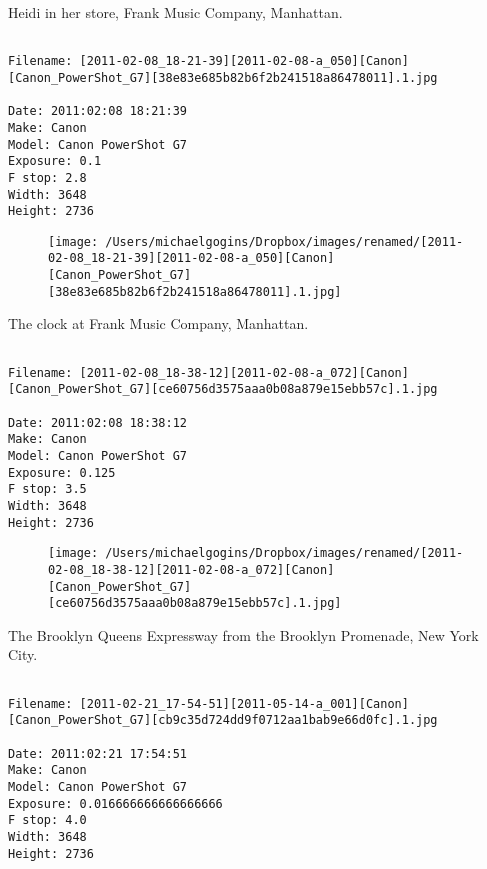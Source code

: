 \documentclass[11pt,letter,DIV=14,paper=landscape]{scrbook}
\begin{document}
\clearpage
\noindent Heidi in her store, Frank Music Company, Manhattan.
\noindent
\begin{lstlisting}

Filename: [2011-02-08_18-21-39][2011-02-08-a_050][Canon][Canon_PowerShot_G7][38e83e685b82b6f2b241518a86478011].1.jpg

Date: 2011:02:08 18:21:39
Make: Canon
Model: Canon PowerShot G7
Exposure: 0.1
F stop: 2.8
Width: 3648
Height: 2736
\end{lstlisting}
\clearpage

\begin{figure}
\texttt{[image: /Users/michaelgogins/Dropbox/images/renamed/[2011-02-08\_18-21-39][2011-02-08-a\_050][Canon][Canon\_PowerShot\_G7][38e83e685b82b6f2b241518a86478011].1.jpg]}
\end{figure}
    
\clearpage
\noindent The clock at Frank Music Company, Manhattan.
\noindent
\begin{lstlisting}

Filename: [2011-02-08_18-38-12][2011-02-08-a_072][Canon][Canon_PowerShot_G7][ce60756d3575aaa0b08a879e15ebb57c].1.jpg

Date: 2011:02:08 18:38:12
Make: Canon
Model: Canon PowerShot G7
Exposure: 0.125
F stop: 3.5
Width: 3648
Height: 2736
\end{lstlisting}
\clearpage

\begin{figure}
\texttt{[image: /Users/michaelgogins/Dropbox/images/renamed/[2011-02-08\_18-38-12][2011-02-08-a\_072][Canon][Canon\_PowerShot\_G7][ce60756d3575aaa0b08a879e15ebb57c].1.jpg]}
\end{figure}
    
\clearpage
\noindent The Brooklyn Queens Expressway from the Brooklyn Promenade, New York City.
\noindent
\begin{lstlisting}

Filename: [2011-02-21_17-54-51][2011-05-14-a_001][Canon][Canon_PowerShot_G7][cb9c35d724dd9f0712aa1bab9e66d0fc].1.jpg

Date: 2011:02:21 17:54:51
Make: Canon
Model: Canon PowerShot G7
Exposure: 0.016666666666666666
F stop: 4.0
Width: 3648
Height: 2736
\end{lstlisting}
\clearpage
\end{document}
